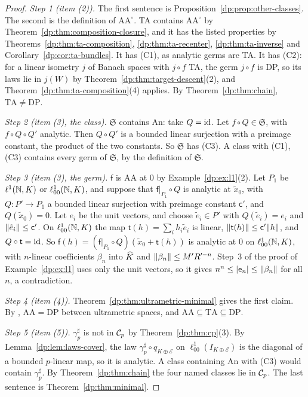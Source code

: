 \begin{proof}
\emph{Step 1 (item (2)).} The first sentence is Proposition~\ref{dp:prop:other-classes}. The second is the definition of $\mathrm{AA}^\circ$. TA contains $\mathrm{AA}^\circ$ by Theorem~\ref{dp:thm:composition-closure}, and it has the listed properties by Theorems~\ref{dp:thm:ta-composition}, \ref{dp:thm:ta-recenter}, \ref{dp:thm:ta-inverse} and Corollary~\ref{dp:cor:ta-bundles}. It has (C1), as analytic germs are TA. It has (C2): for a linear isometry $j$ of Banach spaces with $j\circ f$ TA, the germ $j\circ f$ is DP, so its laws lie in $j(W)$ by Theorem~\ref{dp:thm:target-descent}(2), and Theorem~\ref{dp:thm:ta-composition}(4) applies. By Theorem~\ref{dp:thm:chain}, $\mathrm{TA}\ne\mathrm{DP}$.

\emph{Step 2 (item (3), the class).} $\mathfrak S$ contains An: take $Q=\mathrm{id}$. Let $f\circ Q\in\mathfrak S$, with $f\circ Q\circ Q'$ analytic. Then $Q\circ Q'$ is a bounded linear surjection with a preimage constant, the product of the two constants. So $\mathfrak S$ has (C3). A class with (C1), (C3) contains every germ of $\mathfrak S$, by the definition of $\mathfrak S$.

\emph{Step 3 (item (3), the germ).} $\mathsf f$ is AA at $0$ by Example~\ref{dp:ex:l1}(2). Let $P_1$ be $\ell^1(\mathbb N,K)$ or $\ell^1_{00}(\mathbb N,K)$, and suppose that $\mathsf f|_{P_1}\circ Q$ is analytic at $\tilde x_0$, with $Q\colon P'\to P_1$ a bounded linear surjection with preimage constant $\mathsf c'$, and $Q(\tilde x_0)=0$. Let $e_i$ be the unit vectors, and choose $\tilde e_i\in P'$ with $Q(\tilde e_i)=e_i$ and $\lVert \tilde e_i\rVert\le\mathsf c'$. On $\ell^1_{00}(\mathbb N,K)$ the map $\mathsf t(h)=\sum_ih_i\tilde e_i$ is linear, $\lVert \mathsf t(h)\rVert\le\mathsf c'\lVert h\rVert$, and $Q\circ\mathsf t=\mathrm{id}$. So $\mathsf f(h)=(\mathsf f|_{P_1}\circ Q)(\tilde x_0+\mathsf t(h))$ is analytic at $0$ on $\ell^1_{00}(\mathbb N,K)$, with $n$-linear coefficients $\beta_n$ into $\widehat K$ and $\lVert \beta_n\rVert\le M'R'^{-n}$. Step~3 of the proof of Example~\ref{dp:ex:l1} uses only the unit vectors, so it gives $n^n\le\lvert \mathsf e_n\rvert\le\lVert \beta_n\rVert$ for all $n$, a contradiction.

\emph{Step 4 (item (4)).} Theorem~\ref{dp:thm:ultrametric-minimal} gives the first claim. By \cite[Theorem~14.39(1)]{I}, $\mathrm{AA}=\mathrm{DP}$ between ultrametric spaces, and $\mathrm{AA}\subseteq\mathrm{TA}\subseteq\mathrm{DP}$.

\emph{Step 5 (item (5)).} $\gamma^\sharp_p$ is not in $\mathcal{C}_p$ by Theorem~\ref{dp:thm:cp}(3). By Lemma~\ref{dp:lem:laws-cover}, the law $\gamma^\sharp_p\circ q_{K\oplus\mathcal E}$ on $\ell^1_{00}(I_{K\oplus\mathcal E})$ is the diagonal of a bounded $p$-linear map, so it is analytic. A class containing An with (C3) would contain $\gamma^\sharp_p$. By Theorem~\ref{dp:thm:chain} the four named classes lie in $\mathcal{C}_p$. The last sentence is Theorem~\ref{dp:thm:minimal}.
\end{proof}


